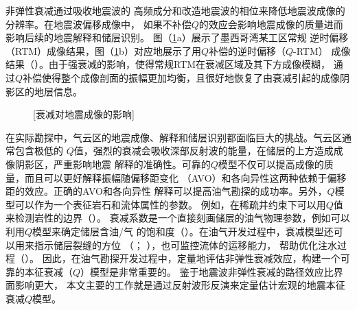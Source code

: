 非弹性衰减通过吸收地震波的
高频成分和改造地震波的相位来降低地震波成像的分辨率。在地震波偏移成像中，
如果不补偿$Q$的效应会影响地震成像的质量进而影响后续的地震解释和储层识别。
图（\ref{fig:qrtm_1}a）展示了墨西哥湾某工区常规
逆时偏移（RTM）成像结果，图（\ref{fig:qrtm_1}b）对应地展示了用$Q$补偿的逆时偏移（$Q$-RTM）
成像结果（）。由于强衰减的影响，使得常规RTM在衰减区域及其下方成像模糊，
通过$Q$补偿使得整个成像剖面的振幅更加均衡，且很好地恢复了由衰减引起的成像阴影区的地层信息。

\begin{figure}[!htbp]
        \centering
		[衰减对地震成像的影响]
        \label{fig:qrtm_1}
\end{figure}

在实际勘探中，气云区的地震成像、解释和储层识别都面临巨大的挑战。气云区通常包含极低的
$Q$值，强烈的衰减会吸收深部反射波的能量，在储层的上方造成成像阴影区，严重影响地震
解释的准确性。可靠的$Q$模型不仅可以提高成像的质量，而且可以更好解释振幅随偏移距变化
（AVO）和各向异性这两种依赖于偏移距的效应。正确的AVO和各向异性
解释可以提高油气勘探的成功率。另外，$Q$模型可以作为一个表征岩石和流体属性的参数。
例如，在稀疏井约束下可以用$Q$值来检测岩性的边界（）。
衰减系数是一个直接刻画储层的油气物理参数，例如可以利用$Q$模型来确定储层含油/气
的饱和度（）。在油气开发过程中，衰减模型还可以用来指示储层裂缝的方位
（； ），也可监控流体的运移能力，
帮助优化注水过程（）。
因此，在油气勘探开发过程中，定量地评估非弹性衰减效应，构建一个可靠的本征衰减（$Q$）模型是非常重要的。
鉴于地震波非弹性衰减的路径效应比界面影响更大，
本文主要的工作就是通过反射波形反演来定量估计宏观的地震本征衰减$Q$模型。

